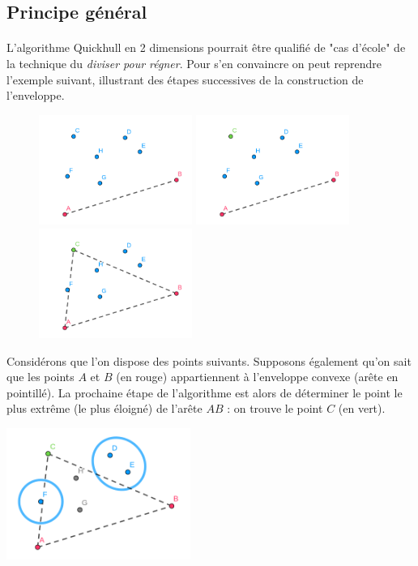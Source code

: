 \documentclass[]{article}
\begin{document}
\subsection{Principe général}
\paragraph{}
L'algorithme Quickhull en 2 dimensions pourrait être qualifié de "cas d'école" de la technique du \emph{diviser pour régner}. Pour s'en convaincre on peut reprendre l'exemple suivant, illustrant des étapes successives de la construction de l'enveloppe.

\begin{figure}[H]
	\includegraphics[width=5cm]{qh2d/geogebra-export.png}
	\includegraphics[width=5cm]{qh2d/geogebra-export2.png}
	\includegraphics[width=5cm]{qh2d/geogebra-export3.png}
\end{figure}

Considérons que l'on dispose des points suivants. Supposons également qu'on sait que les points $A$ et $B$ (en rouge) appartiennent à l'enveloppe convexe (arête en pointillé). La prochaine étape de l'algorithme est alors de déterminer le point le plus extrême (le plus éloigné) de l'arête $AB$ : on trouve le point $C$ (en vert).

\includegraphics[width=6cm]{qh2d/geogebra-export4.png}
\end{document}

